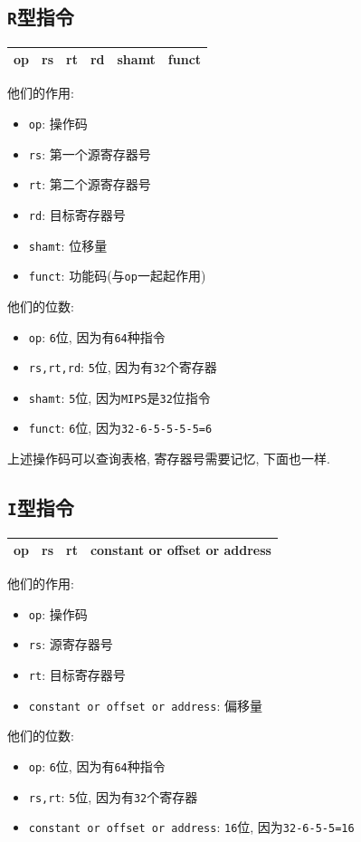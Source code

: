 \subsection{\texttt{R}型指令}
\begin{table}[H]
\centering
\begin{tabularx}{\textwidth}{|Z|Z|Z|Z|Z|Z|}
\hline
op & rs & rt & rd & shamt & funct  \\
\hline
\end{tabularx}
\end{table} \par 
他们的作用:
\begin{itemize}
\item \verb|op|: 操作码
\item \verb|rs|: 第一个源寄存器号
\item \verb|rt|: 第二个源寄存器号
\item \verb|rd|: 目标寄存器号
\item \verb|shamt|: 位移量
\item \verb|funct|: 功能码(与\verb|op|一起起作用)
\end{itemize} \par 
他们的位数:
\begin{itemize}
\item \verb|op|: \verb|6|位, 因为有\verb|64|种指令
\item \verb|rs,rt,rd|: \verb|5|位, 因为有\verb|32|个寄存器
\item \verb|shamt|: \verb|5|位, 因为\texttt{MIPS}是\verb|32|位指令
\item \verb|funct|: \verb|6|位, 因为\verb|32-6-5-5-5-5=6|
\end{itemize}\par
上述操作码可以查询表格, 寄存器号需要记忆, 下面也一样.
\subsection{\texttt{I}型指令}
\begin{table}[H]
\centering
\begin{tabularx}{\textwidth}{|Z|Z|Z|p{15em}<{\centering}|}
\hline
op & rs & rt & constant or offset or address \\
\hline
\end{tabularx}
\end{table}\par
他们的作用:
\begin{itemize}
\item \verb|op|: 操作码
\item \verb|rs|: 源寄存器号
\item \verb|rt|: 目标寄存器号
\item \verb|constant or offset or address|: 偏移量
\end{itemize}\par
他们的位数:
\begin{itemize}
\item \verb|op|: \verb|6|位, 因为有\verb|64|种指令
\item \verb|rs,rt|: \verb|5|位, 因为有\verb|32|个寄存器
\item \verb|constant or offset or address|: \verb|16|位, 因为\verb|32-6-5-5=16|
\end{itemize}

